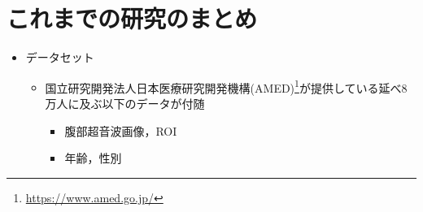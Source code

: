 \documentclass[a4j]{ujarticle}
\begin{document}
	\section{これまでの研究のまとめ}
		\begin{itemize}
			\item データセット
			\begin{itemize}
				\item 国立研究開発法人日本医療研究開発機構(AMED)\footnote{\url{https://www.amed.go.jp/}}が提供している延べ8万人に及ぶ以下のデータが付随
				\begin{itemize}
					\item 腹部超音波画像，ROI
					\item 年齢，性別
				\end{itemize}
			\end{itemize}


\end{itemize}
\end{document}

